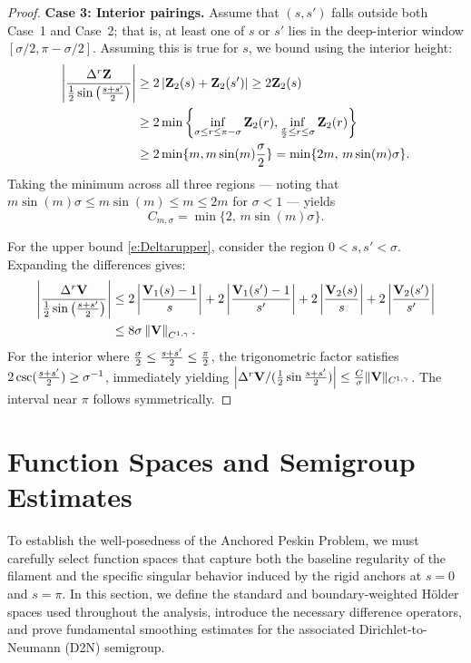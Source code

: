 \documentclass{amsart}
\newcommand{\mZ}{\mathbf{Z}}
\newcommand{\mV}{\mathbf{V}}
\begin{document}
\begin{proof}
\textbf{Case 3: Interior pairings.} Assume that $(s,s')$ falls outside both Case~1 and Case~2; that is, at least one of $s$ or $s'$ lies in the deep-interior window $[\sigma/2, \pi - \sigma/2]$. Assuming this is true for $s$, we bound using the interior height:
\begin{align*}
\left| { \Delta^r \mZ \over {1\over2} \sin \left( {s+ s' \over2} \right) } \right|
& \geq 2 \left| \mZ_2(s)  + \mZ_2(s') \right| \geq 2 \mZ_2(s) \\
& \geq 2 \min\left\{ \inf_{\sigma \le r \le \pi - \sigma} \mZ_2(r) , \inf_{{\sigma \over 2} \le r \le \sigma} \mZ_2(r) \right\} \\
& \geq 2 \min\{ m, m\sin(m) {\sigma \over 2}  \} = \min\{2m,\, m\sin(m)\sigma\}.
\end{align*}
Taking the minimum across all three regions — noting that $m\sin(m)\sigma \leq m\sin(m) \leq m \leq 2m$ for $\sigma < 1$ — yields
\[
C_{m,\sigma} = \min\bigl\{ 2,\, m\sin(m)\sigma \bigr\}.
\]

For the upper bound \eqref{e:Deltarupper}, consider the region $0 < s,s' < \sigma$. Expanding the differences gives:
\begin{align*}
\left| { \Delta^r \mV \over {1\over 2} \sin\left( {s + s' \over 2} \right) }\right|
& \leq 2 \left| { \mV_1(s)  -1   \over  s }\right|+ 2 \left| { \mV_1(s') - 1   \over  s' }\right|+ 2\left| { \mV_2(s)   \over s }\right| 
+ 2\left| { \mV_2(s')  \over s' }\right| \\
& \leq 8 \sigma \left\| \mV \right\|_{C^{1,\gamma}} .
\end{align*}
For the interior where ${\sigma \over 2} \leq {s + s'\over 2} \leq {\pi \over 2}$, the trigonometric factor satisfies $2 \csc({s+s'\over 2}) \geq \sigma^{-1}$, immediately yielding $\left| \Delta^r \mV / ({1\over 2} \sin {s + s' \over 2}) \right| \leq {C \over \sigma} \| \mV \|_{C^{1,\gamma}}$. The interval near $\pi$ follows symmetrically.
\end{proof}
\section{Function Spaces and Semigroup Estimates}

To establish the well-posedness of the Anchored Peskin Problem, we must carefully select function spaces that capture both the baseline regularity of the filament and the specific singular behavior induced by the rigid anchors at $s=0$ and $s=\pi$. In this section, we define the standard and boundary-weighted Hölder spaces used throughout the analysis, introduce the necessary difference operators, and prove fundamental smoothing estimates for the associated Dirichlet-to-Neumann (D2N) semigroup.
\end{document}
